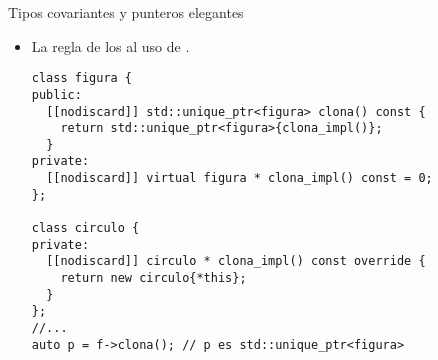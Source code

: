 \begin{frame}[t,fragile]{Tipos covariantes y punteros elegantes}
\begin{itemize}
  \item La regla de los  
        al uso de .

\begin{lstlisting}
class figura {
public:
  [[nodiscard]] std::unique_ptr<figura> clona() const {
    return std::unique_ptr<figura>{clona_impl()};
  }
private:
  [[nodiscard]] virtual figura * clona_impl() const = 0;
};

class circulo {
private:
  [[nodiscard]] circulo * clona_impl() const override {
    return new circulo{*this};
  }
};
//...
auto p = f->clona(); // p es std::unique_ptr<figura>
\end{lstlisting}
\end{itemize}
\end{frame}
